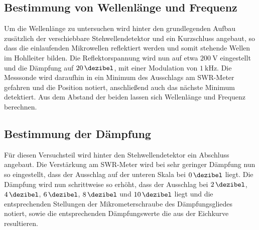 \subsection{Bestimmung von Wellenlänge und Frequenz}
Um die Wellenlänge zu untersuchen wird hinter den grundlegenden Aufbau zusätzlich der
verschiebbare Stehwellendetektor und ein Kurzschluss angebaut, so dass die einlaufenden
Mikrowellen reflektiert werden und somit stehende Wellen im Hohlleiter bilden. Die Reflektorspannung
wird nun auf etwa $\SI{200}{\volt}$ eingestellt und die Dämpfung auf $\SI{20}{\dezibel}$, mit einer
Modulation von $\SI{1}{\kilo\hertz}$. Die Messsonde wird daraufhin in ein Minimum des Ausschlags am SWR-Meter
gefahren und die Position notiert, anschließend auch das nächste Minimum detektiert. Aus dem
Abstand der beiden lassen sich Wellenlänge und Frequenz berechnen.

\subsection{Bestimmung der Dämpfung}
Für diesen Versuchsteil wird hinter den Stehwellendetektor ein Abschluss angebaut. Die Verstärkung am
SWR-Meter wird bei sehr geringer Dämpfung nun so eingestellt, dass der Ausschlag auf der
unteren Skala bei $\SI{0}{\dezibel}$ liegt. Die Dämpfung wird nun schrittweise so erhöht, dass
der Ausschlag bei $\SI{2}{\dezibel}$, $\SI{4}{\dezibel}$, $\SI{6}{\dezibel}$, $\SI{8}{\dezibel}$
und $\SI{10}{\dezibel}$ liegt und die entsprechenden Stellungen der Mikrometerschraube des Dämpfungsgliedes
notiert, sowie die entsprechenden Dämpfungswerte die aus der Eichkurve resultieren.

